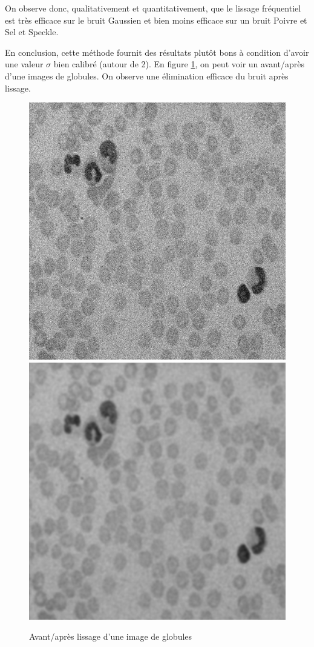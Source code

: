 \documentclass[paper=a4, fontsize=11pt]{scrartcl} %
\begin{document}
On observe donc, qualitativement et quantitativement, que le lissage fréquentiel est très efficace sur le bruit Gaussien et bien moins efficace sur un bruit Poivre et Sel et Speckle. 

En conclusion, cette méthode fournit des résultats plutôt bons à condition d'avoir une valeur $\sigma$ bien calibré (autour de 2). En figure \ref{avantapresglobules}, on peut voir un avant/après d'une images de globules. On observe une élimination efficace du bruit après lissage.

\begin{figure}[h!]
\centering
\caption{Avant/après lissage d'une image de globules}
\label{avantapresglobules}
\includegraphics[scale=0.3]{images/rapport/globulesav.png} 
\includegraphics[scale=0.3]{images/rapport/globules2.png}
\end{figure}
\end{document}
